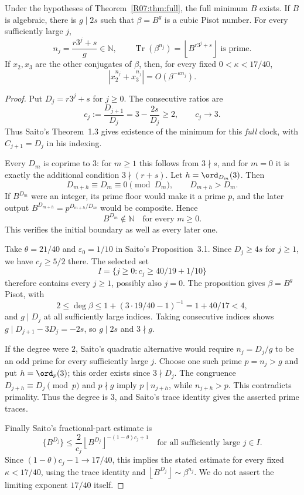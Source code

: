 \documentclass[11pt,a4paper]{article}
\theoremstyle{definition}\newtheorem{definition}[theorem]{Definition}
\theoremstyle{remark}\newtheorem{remark}[theorem]{Remark}
\newcommand{\N}{\mathbb N}\newcommand{\Z}{\mathbb Z}\newcommand{\Q}{\mathbb Q}
\newcommand{\floor}[1]{\left\lfloor#1\right\rfloor}
\DeclareMathOperator{\Tr}{Tr}\DeclareMathOperator{\tr}{tr}\DeclareMathOperator{\Nm}{N}
\begin{document}
\begin{proposition}\label{R07:prop:bridge}
Under the hypotheses of Theorem~\ref{R07:thm:full}, the full minimum $B$
exists. If $B$ is algebraic, there is $g\mid2s$ such that
$\beta=B^g$ is a cubic Pisot number. For every sufficiently large $j$,
\[
 n_j=\frac{r3^j+s}{g}\in\N,\qquad
 \Tr(\beta^{n_j})=\floor{B^{r3^j+s}}\text{ is prime}.
\]
If $x_2,x_3$ are the other conjugates of $\beta$, then, for every fixed
$0<\kappa<17/40$,
\[
                  |x_2^{n_j}+x_3^{n_j}|
                         =O(\beta^{-\kappa n_j}).
\]
\end{proposition}
\begin{proof}
Put $D_j=r3^j+s$ for $j\ge0$. The consecutive ratios are
\[
 c_j:=\frac{D_{j+1}}{D_j}=3-\frac{2s}{D_j}\ge2,
 \qquad c_j\longrightarrow3.
\]
Thus Saito's Theorem~1.3 gives existence of the minimum for this
\emph{full} clock, with $C_{j+1}=D_j$ in his indexing.

Every $D_m$ is coprime to $3$: for $m\ge1$ this follows from
$3\nmid s$, and for $m=0$ it is exactly the additional condition
$3\nmid(r+s)$. Let $h=\ord_{D_m}(3)$. Then
\[
                 D_{m+h}\equiv D_m\equiv0\pmod{D_m},
                 \qquad D_{m+h}>D_m.
\]
If $B^{D_m}$ were an integer, its prime floor would make it a prime
$p$, and the later output $B^{D_{m+h}}=p^{D_{m+h}/D_m}$ would be
composite. Hence
\begin{equation}\label{R07:eq:nonintegral}
                     B^{D_m}\notin\N\quad\text{for every }m\ge0.
\end{equation}
This verifies the initial boundary as well as every later one.

Take $\theta=21/40$ and $\varepsilon_0=1/10$ in Saito's
Proposition~3.1. Since $D_j\ge4s$ for $j\ge1$, we have $c_j\ge5/2$
there. The selected set
\[
          I=\{j\ge0:c_j\ge40/19+1/10\}
\]
therefore contains every $j\ge1$, possibly also $j=0$.
The proposition gives $\beta=B^g$ Pisot, with
\[
        2\le\deg\beta\le1+(3\cdot19/40-1)^{-1}
                            =1+40/17<4,
\]
and $g\mid D_j$ at all sufficiently large indices.
Taking consecutive indices shows
$g\mid D_{j+1}-3D_j=-2s$, so $g\mid2s$ and $3\nmid g$.

If the degree were $2$, Saito's quadratic alternative would require
$n_j=D_j/g$ to be an odd prime for every sufficiently large $j$.
Choose one such prime $p=n_j>g$ and put $h=\ord_p(3)$; this order
exists since $3\nmid D_j$. The congruence
$D_{j+h}\equiv D_j\pmod p$ and $p\nmid g$ imply
$p\mid n_{j+h}$, while $n_{j+h}>p$. This contradicts primality.
Thus the degree is $3$, and Saito's trace identity gives the asserted
prime traces.

Finally Saito's fractional-part estimate is
\[
 \{B^{D_j}\}\le\frac{2}{c_j}
       \floor{B^{D_j}}^{-(1-\theta)c_j+1}
              \quad\text{for all sufficiently large }j\in I.
\]
Since $(1-\theta)c_j-1\to17/40$, this implies the stated estimate
for every fixed $\kappa<17/40$, using the trace identity and
$\floor{B^{D_j}}\sim\beta^{n_j}$. We do not assert the limiting
exponent $17/40$ itself.
\end{proof}
\end{document}
